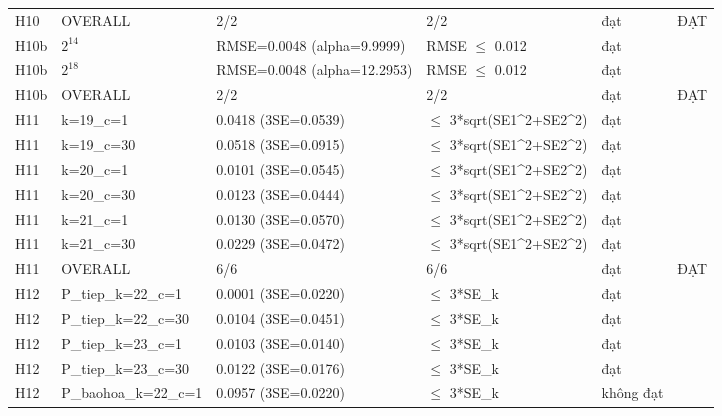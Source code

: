 \begin{longtable}{p{0.8cm}p{2.2cm}p{3.9cm}p{3.2cm}p{1.1cm}p{2.4cm}}
H10 & OVERALL & 2/2 & 2/2 & đạt & ĐẠT \\
H10b & $2^{14}$ & RMSE=\allowbreak{}0.0048 (alpha=\allowbreak{}9.9999) & RMSE $\le$\allowbreak{} 0.012 & đạt &  \\
H10b & $2^{18}$ & RMSE=\allowbreak{}0.0048 (alpha=\allowbreak{}12.2953) & RMSE $\le$\allowbreak{} 0.012 & đạt &  \\
H10b & OVERALL & 2/2 & 2/2 & đạt & ĐẠT \\
H11 & k=\allowbreak{}19\_\allowbreak{}c=\allowbreak{}1 & 0.0418 (3SE=\allowbreak{}0.0539) & $\le$\allowbreak{} 3*sqrt(SE1\^{}2+SE2\^{}2) & đạt &  \\
H11 & k=\allowbreak{}19\_\allowbreak{}c=\allowbreak{}30 & 0.0518 (3SE=\allowbreak{}0.0915) & $\le$\allowbreak{} 3*sqrt(SE1\^{}2+SE2\^{}2) & đạt &  \\
H11 & k=\allowbreak{}20\_\allowbreak{}c=\allowbreak{}1 & 0.0101 (3SE=\allowbreak{}0.0545) & $\le$\allowbreak{} 3*sqrt(SE1\^{}2+SE2\^{}2) & đạt &  \\
H11 & k=\allowbreak{}20\_\allowbreak{}c=\allowbreak{}30 & 0.0123 (3SE=\allowbreak{}0.0444) & $\le$\allowbreak{} 3*sqrt(SE1\^{}2+SE2\^{}2) & đạt &  \\
H11 & k=\allowbreak{}21\_\allowbreak{}c=\allowbreak{}1 & 0.0130 (3SE=\allowbreak{}0.0570) & $\le$\allowbreak{} 3*sqrt(SE1\^{}2+SE2\^{}2) & đạt &  \\
H11 & k=\allowbreak{}21\_\allowbreak{}c=\allowbreak{}30 & 0.0229 (3SE=\allowbreak{}0.0472) & $\le$\allowbreak{} 3*sqrt(SE1\^{}2+SE2\^{}2) & đạt &  \\
H11 & OVERALL & 6/6 & 6/6 & đạt & ĐẠT \\
H12 & P\_\allowbreak{}tiep\_\allowbreak{}k=\allowbreak{}22\_\allowbreak{}c=\allowbreak{}1 & 0.0001 (3SE=\allowbreak{}0.0220) & $\le$\allowbreak{} 3*SE\_\allowbreak{}k & đạt &  \\
H12 & P\_\allowbreak{}tiep\_\allowbreak{}k=\allowbreak{}22\_\allowbreak{}c=\allowbreak{}30 & 0.0104 (3SE=\allowbreak{}0.0451) & $\le$\allowbreak{} 3*SE\_\allowbreak{}k & đạt &  \\
H12 & P\_\allowbreak{}tiep\_\allowbreak{}k=\allowbreak{}23\_\allowbreak{}c=\allowbreak{}1 & 0.0103 (3SE=\allowbreak{}0.0140) & $\le$\allowbreak{} 3*SE\_\allowbreak{}k & đạt &  \\
H12 & P\_\allowbreak{}tiep\_\allowbreak{}k=\allowbreak{}23\_\allowbreak{}c=\allowbreak{}30 & 0.0122 (3SE=\allowbreak{}0.0176) & $\le$\allowbreak{} 3*SE\_\allowbreak{}k & đạt &  \\
H12 & P\_\allowbreak{}baohoa\_\allowbreak{}k=\allowbreak{}22\_\allowbreak{}c=\allowbreak{}1 & 0.0957 (3SE=\allowbreak{}0.0220) & $\le$\allowbreak{} 3*SE\_\allowbreak{}k & không đạt &  \\

\end{longtable}
